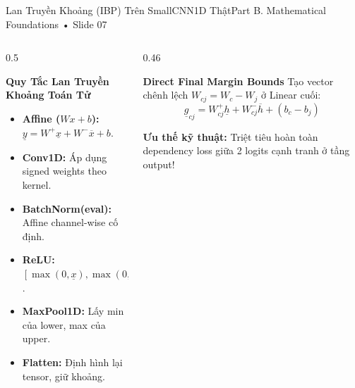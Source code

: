 \documentclass[aspectratio=169, 10pt]{beamer}
\begin{document}
\begin{frame}{Lan Truyền Khoảng (IBP) Trên SmallCNN1D Thật}{Part B. Mathematical Foundations • Slide 07}
    \begin{columns}
        \begin{column}{0.5\textwidth}
            \begin{block}{\textbf{Quy Tắc Lan Truyền Khoảng Toán Tử}}
                \footnotesize
                \begin{itemize}
                    \item \textbf{Affine ($Wx+b$):} $\underline{y} = W^+ \underline{x} + W^- \overline{x} + b$.
                    \item \textbf{Conv1D:} Áp dụng signed weights theo kernel.
                    \item \textbf{BatchNorm(eval):} Affine channel-wise cố định.
                    \item \textbf{ReLU:} $[\max(0, \underline{x}), \max(0, \overline{x})]$.
                    \item \textbf{MaxPool1D:} Lấy min của lower, max của upper.
                    \item \textbf{Flatten:} Định hình lại tensor, giữ khoảng.
                \end{itemize}
            \end{block}
        \end{column}
        \begin{column}{0.46\textwidth}
            \begin{block}{\textbf{Direct Final Margin Bounds}}
                \footnotesize
                Tạo vector chênh lệch $W_{cj} = W_c - W_j$ ở Linear cuối:
                $$\underline{g}_{cj} = W_{cj}^+ \underline{h} + W_{cj}^- \overline{h} + (b_c - b_j)$$
            \end{block}
            \vspace{0.1cm}
            \alert{\textbf{Ưu thế kỹ thuật:}} Triệt tiêu hoàn toàn dependency loss giữa 2 logits cạnh tranh ở tầng output!
        \end{column}
    \end{columns}
\end{frame}
\end{document}
